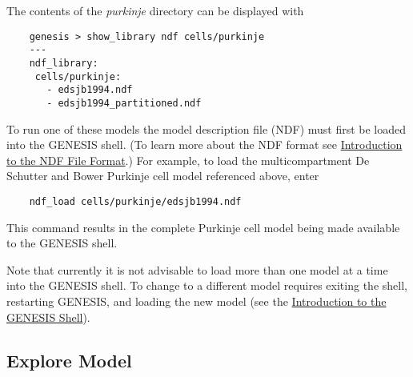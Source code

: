 \documentclass[12pt]{article}
\begin{document}
The contents of the {\it purkinje} directory can be displayed with
\begin{verbatim}
    genesis > show_library ndf cells/purkinje
    ---
    ndf_library:
     cells/purkinje:
       - edsjb1994.ndf
       - edsjb1994_partitioned.ndf
\end{verbatim}

To run one of these models the model description file (NDF) must first be loaded into the GENESIS shell.  (To learn more about the NDF format see  \href{../ndf-file-format/ndf-file-format.tex}{Introduction to the NDF File Format}.) For example, to load the multicompartment De Schutter and Bower Purkinje cell model referenced above, enter
\begin{verbatim}
    ndf_load cells/purkinje/edsjb1994.ndf
\end{verbatim}
This command results in the complete Purkinje cell model being made available to the GENESIS shell.

Note that currently it is not advisable to load more than one model at a time into the GENESIS shell. To change to a different model requires exiting the shell, restarting GENESIS, and loading the new model (see the \href{../gshell/gshell.tex}{Introduction to the GENESIS Shell}).

\subsection*{Explore Model}
\end{document}
